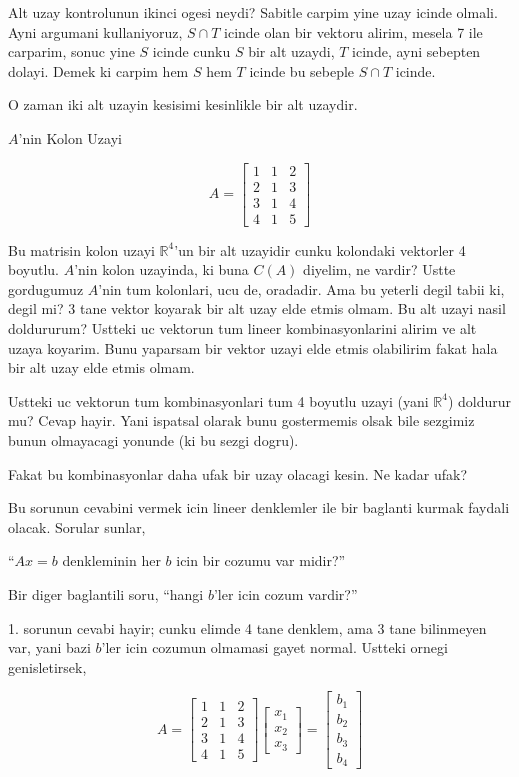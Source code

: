 \documentclass[12pt,fleqn]{article}\usepackage{../common}
\begin{document}
Alt uzay kontrolunun ikinci ogesi neydi? Sabitle carpim yine uzay icinde
olmali. Ayni argumani kullaniyoruz, $S \cap T$ icinde olan bir vektoru
alirim, mesela 7 ile carparim, sonuc yine $S$ icinde cunku $S$ bir alt
uzaydi, $T$ icinde, ayni sebepten dolayi. Demek ki carpim hem $S$ hem $T$
icinde bu sebeple $S \cap T$ icinde.

O zaman iki alt uzayin kesisimi kesinlikle bir alt uzaydir. 

$A$'nin Kolon Uzayi

$$ A = 
\left[\begin{array}{rrr}
1 & 1 & 2 \\
2 & 1 & 3 \\
3 & 1 & 4 \\
4 & 1 & 5 
\end{array}\right]
 $$


Bu matrisin kolon uzayi $\mathbb{R}^4$'un bir alt uzayidir cunku kolondaki
vektorler 4 boyutlu. $A$'nin kolon uzayinda, ki buna $C(A)$ diyelim, ne
vardir? Ustte gordugumuz $A$'nin tum kolonlari, ucu de, oradadir. Ama bu
yeterli degil tabii ki, degil mi? 3 tane vektor koyarak bir alt uzay elde
etmis olmam. Bu alt uzayi nasil doldururum? Ustteki uc vektorun tum lineer
kombinasyonlarini alirim ve alt uzaya koyarim. Bunu yaparsam bir vektor
uzayi elde etmis olabilirim fakat hala bir alt uzay elde etmis olmam. 

Ustteki uc vektorun tum kombinasyonlari tum 4 boyutlu uzayi (yani
$\mathbb{R}^4$) doldurur mu? Cevap hayir. Yani ispatsal olarak bunu
gostermemis olsak bile sezgimiz bunun olmayacagi yonunde (ki bu sezgi
dogru). 

Fakat bu kombinasyonlar daha ufak bir uzay olacagi kesin. Ne kadar ufak? 

Bu sorunun cevabini vermek icin lineer denklemler ile bir baglanti kurmak
faydali olacak. Sorular sunlar,

``$Ax = b$ denkleminin her $b$ icin bir cozumu var midir?''

Bir diger baglantili soru, ``hangi $b$'ler icin cozum vardir?''

1. sorunun cevabi hayir; cunku elimde 4 tane denklem, ama 3 tane bilinmeyen
var, yani bazi $b$'ler icin cozumun olmamasi gayet normal. Ustteki ornegi
genisletirsek,

$$ A = 
\left[\begin{array}{rrr}
1 & 1 & 2 \\
2 & 1 & 3 \\
3 & 1 & 4 \\
4 & 1 & 5 
\end{array}\right]
\left[\begin{array}{r}
x_1  \\
x_2  \\
x_3  
\end{array}\right] 
=
\left[\begin{array}{r}
b_1  \\
b_2  \\
b_3  \\
b_4  
\end{array}\right]
 $$
\end{document}

